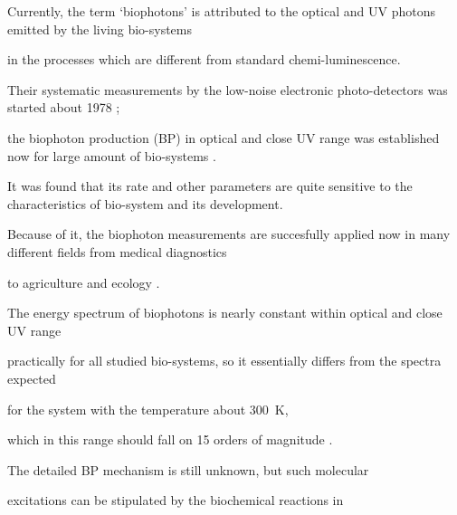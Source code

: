


\date{25/II/2011} %









\makeengtitlef



\English




 Currently, the term `biophotons' is attributed  to the optical and UV photons emitted by the living bio-systems

 in the processes which are different  from standard chemi-luminescence.

 Their systematic measurements  by the low-noise electronic photo-detectors was started about 1978  \cite {mayb:1, mayb:2};

 the  biophoton production (BP)  in optical and close UV range was established now for  large amount of  bio-systems \cite{mayb:3, mayb:B4}.

  It was  found that its rate and other parameters are quite sensitive to the characteristics of bio-system and its development.

  Because of it,  the biophoton measurements are succesfully applied now in many different fields from medical diagnostics

   to agriculture and ecology \cite {mayb:2}.



  The energy  spectrum  of biophotons is nearly constant  within optical and close UV  range

   practically  for all studied bio-systems, so it  essentially differs from the  spectra expected

 for the system with the  temperature about $300$~K,

 which in this range should fall on 15 orders of magnitude \cite {mayb:2, mayb:3}.

The detailed BP mechanism is still unknown, but such molecular

excitations can be stipulated by the biochemical reactions in

